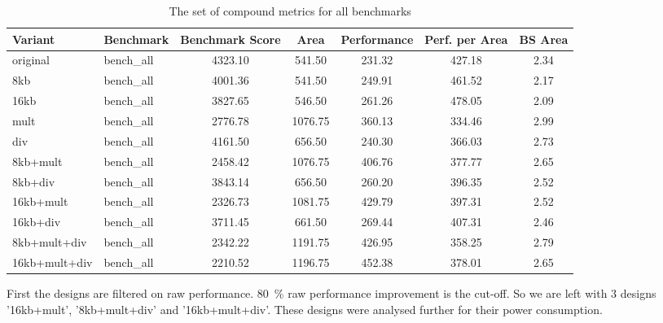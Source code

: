 \documentclass[final]{article}
\begin{document}
\begin{table}[H]
    \centering
    \caption{The set of compound metrics for all benchmarks}
    \label{tab:compound-bench-all}
    \begin{tabular}{llS[table-format=4.2]S[table-format=4.2]S[table-format=4.2]S[table-format=4.2]S[table-format=4.2]}
        \toprule
        \textbf{Variant}   &  \textbf{Benchmark} & \textbf{Benchmark Score} & \textbf{Area} & \textbf{Performance} & \textbf{Perf. per Area} & \textbf{BS Area}\\
        \midrule
            original       & bench\_all &    4323.10 &     541.50 &     231.32 &     427.18 &       2.34 \\
            8kb            & bench\_all &    4001.36 &     541.50 &     249.91 &     461.52 &       2.17 \\
            16kb           & bench\_all &    3827.65 &     546.50 &     261.26 &     478.05 &       2.09 \\
            mult           & bench\_all &    2776.78 &    1076.75 &     360.13 &     334.46 &       2.99 \\
            div            & bench\_all &    4161.50 &     656.50 &     240.30 &     366.03 &       2.73 \\
            8kb+mult       & bench\_all &    2458.42 &    1076.75 &     406.76 &     377.77 &       2.65 \\
            8kb+div        & bench\_all &    3843.14 &     656.50 &     260.20 &     396.35 &       2.52 \\
            16kb+mult      & bench\_all &    2326.73 &    1081.75 &     429.79 &     397.31 &       2.52 \\
            16kb+div       & bench\_all &    3711.45 &     661.50 &     269.44 &     407.31 &       2.46 \\
            8kb+mult+div   & bench\_all &    2342.22 &    1191.75 &     426.95 &     358.25 &       2.79 \\
            16kb+mult+div  & bench\_all &    2210.52 &    1196.75 &     452.38 &     378.01 &       2.65 \\
        \bottomrule
    \end{tabular}
\end{table}

First the designs are filtered on raw performance.
\SI{80}{\percent} raw performance improvement is the cut-off.
So we are left with 3 designs '16kb+mult', '8kb+mult+div' and '16kb+mult+div'.
These designs were analysed further for their power consumption.
\end{document}
